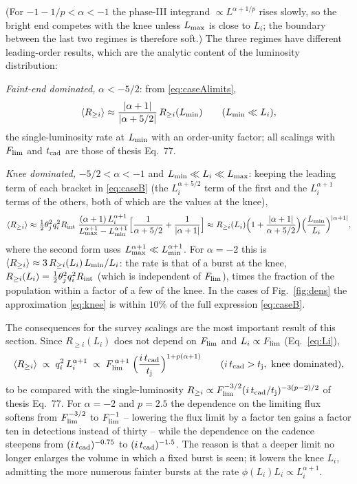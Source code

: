 \documentclass[11pt,a4paper]{article}
\newcommand{\Flim}{F_{\rm lim}}
\newcommand{\Rint}{R_{\rm int}}
\newcommand{\tcad}{t_{\rm cad}}
\newcommand{\tj}{t_{\rm j}}
\newcommand{\Ravg}{\langle R_{\geq i}\rangle}
\newcommand{\Lmin}{L_{\rm min}}
\newcommand{\Lmax}{L_{\rm max}}
\begin{document}
\noindent (For $-1-1/p<\alpha<-1$ the phase-III integrand $\propto L^{\alpha+1/p}$ rises slowly, so the bright end competes with the knee unless $\Lmax$ is close to $L_i$; the boundary between the last two regimes is therefore soft.) The three regimes have different leading-order results, which are the analytic content of the luminosity distribution:

\medskip\noindent\emph{Faint-end dominated,} $\alpha<-5/2$: from \eqref{eq:caseAlimits},
\begin{equation}
\label{eq:faint}
\Ravg\approx\frac{|\alpha+1|}{|\alpha+5/2|}\,R_{\geq i}(\Lmin)\qquad(\Lmin\ll L_i),
\end{equation}
the single-luminosity rate at $\Lmin$ with an order-unity factor; all scalings with $\Flim$ and $\tcad$ are those of thesis Eq.~77.

\medskip\noindent\emph{Knee dominated,} $-5/2<\alpha<-1$ and $\Lmin\ll L_i\ll\Lmax$: keeping the leading term of each bracket in \eqref{eq:caseB} (the $L_i^{\alpha+5/2}$ term of the first and the $L_i^{\alpha+1}$ terms of the others, both of which are the values at the knee),
\begin{equation}
\label{eq:knee}
\Ravg\approx\tfrac12\theta_j^2q_i^2\Rint\;\frac{(\alpha+1)\,L_i^{\alpha+1}}{\Lmax^{\alpha+1}-\Lmin^{\alpha+1}}\Bigl[\frac{1}{\alpha+5/2}+\frac{1}{|\alpha+1|}\Bigr]
\approx R_{\geq i}(L_i)\Bigl(1+\frac{|\alpha+1|}{\alpha+5/2}\Bigr)\Bigl(\frac{\Lmin}{L_i}\Bigr)^{|\alpha+1|},
\end{equation}
where the second form uses $\Lmax^{\alpha+1}\ll\Lmin^{\alpha+1}$. For $\alpha=-2$ this is $\Ravg\approx3\,R_{\geq i}(L_i)\,\Lmin/L_i$: the rate is that of a burst at the knee, $R_{\geq i}(L_i)=\tfrac12\theta_j^2q_i^2\Rint$ (which is independent of $\Flim$), times the fraction of the population within a factor of a few of the knee. In the cases of Fig.~\ref{fig:dens} the approximation \eqref{eq:knee} is within $10\%$ of the full expression \eqref{eq:caseB}.

The consequences for the survey scalings are the most important result of this section. Since $R_{\geq i}(L_i)$ does not depend on $\Flim$ and $L_i\propto\Flim$ (Eq.~\eqref{eq:Li}),
\begin{equation}
\label{eq:kneescaling}
\Ravg\;\propto\;q_i^2\,L_i^{\alpha+1}\;\propto\;\Flim^{\,\alpha+1}\;\Bigl(\frac{i\,\tcad}{\tj}\Bigr)^{1+p(\alpha+1)}\qquad(i\,\tcad>\tj,\ \text{knee dominated}),
\end{equation}
to be compared with the single-luminosity $R_{\geq i}\propto\Flim^{-3/2}(i\,\tcad/\tj)^{-3(p-2)/2}$ of thesis Eq.~77. For $\alpha=-2$ and $p=2.5$ the dependence on the limiting flux softens from $\Flim^{-3/2}$ to $\Flim^{-1}$ -- lowering the flux limit by a factor ten gains a factor ten in detections instead of thirty -- while the dependence on the cadence steepens from $(i\,\tcad)^{-0.75}$ to $(i\,\tcad)^{-1.5}$. The reason is that a deeper limit no longer enlarges the volume in which a fixed burst is seen; it lowers the knee $L_i$, admitting the more numerous fainter bursts at the rate $\phi(L_i)L_i\propto L_i^{\alpha+1}$.
\end{document}
